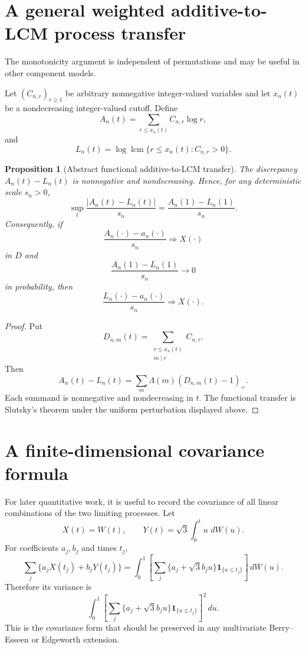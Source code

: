 \documentclass[11pt]{article}
\newtheorem{proposition}[theorem]{Proposition}
\theoremstyle{definition}
\theoremstyle{remark}
\newcommand{\one}{\mathbf 1}
\newcommand{\dd}{\,d}
\newcommand{\lcm}{\operatorname{lcm}}
\begin{document}
\appendix

\section{A general weighted additive-to-LCM process transfer}

The monotonicity argument is independent of permutations and may be useful in
other component models.

Let $(C_{n,r})_{r\ge1}$ be arbitrary nonnegative integer-valued variables and
let $x_n(t)$ be a nondecreasing integer-valued cutoff.  Define
\[
 A_n(t)=\sum_{r\le x_n(t)}C_{n,r}\log r,
\]
and
\[
 L_n(t)=\log\lcm\{r\le x_n(t):C_{n,r}>0\}.
\]

\begin{proposition}[Abstract functional additive-to-LCM transfer]
\label{prop:abstract-transfer}
The discrepancy $A_n(t)-L_n(t)$ is nonnegative and nondecreasing.  Hence, for
any deterministic scale $s_n>0$,
\[
 \sup_t\frac{|A_n(t)-L_n(t)|}{s_n}
 =\frac{A_n(1)-L_n(1)}{s_n}.
\]
Consequently, if
\[
 \frac{A_n(\cdot)-a_n(\cdot)}{s_n}\Rightarrow X(\cdot)
\]
in $D$ and
\[
 \frac{A_n(1)-L_n(1)}{s_n}\longrightarrow0
\]
in probability, then
\[
 \frac{L_n(\cdot)-a_n(\cdot)}{s_n}\Rightarrow X(\cdot).
\]
\end{proposition}

\begin{proof}
Put
\[
 D_{n,m}(t)=\sum_{\substack{r\le x_n(t)\\m\mid r}}C_{n,r}.
\]
Then
\[
 A_n(t)-L_n(t)
 =\sum_m\Lambda(m)(D_{n,m}(t)-1)_+.
\]
Each summand is nonnegative and nondecreasing in $t$.  The functional transfer
is Slutsky's theorem under the uniform perturbation displayed above.
\end{proof}

\section{A finite-dimensional covariance formula}

For later quantitative work, it is useful to record the covariance of all
linear combinations of the two limiting processes.  Let
\[
 X(t)=W(t),
 \qquad
 Y(t)=\sqrt3\int_0^t u\,\dd W(u).
\]
For coefficients $a_j,b_j$ and times $t_j$,
\[
 \sum_j\{a_jX(t_j)+b_jY(t_j)\}
 =\int_0^1
 \left[
 \sum_j\{a_j+\sqrt3b_ju\}\one_{\{u\le t_j\}}
 \right]\dd W(u).
\]
Therefore its variance is
\begin{equation}\label{eq:general-variance}
 \int_0^1
 \left[
 \sum_j\{a_j+\sqrt3b_ju\}\one_{\{u\le t_j\}}
 \right]^2\dd u.
\end{equation}
This is the covariance form that should be preserved in any multivariate
Berry--Esseen or Edgeworth extension.
\end{document}
